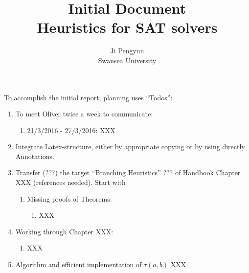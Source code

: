 \documentclass{article}
\begin{document}
\title{Initial Document\\Heuristics for SAT solvers}
\author{Ji Pengyun\\Swansea University}

\maketitle

To accomplish the initial report, planning uses ``Todos'':
\begin{enumerate}
\item To meet Oliver twice a week to communicate:
  \begin{enumerate}[Week 1]
  \item 21/3/2016 - 27/3/2016: XXX
  \end{enumerate}
\item Integrate Latex-structure, either by appropriate copying or by using directly Annotations.
\item Transfer (???) the target ``Branching Heuristics'' ??? of Handbook Chapter XXX (references needed). Start with
  \begin{enumerate}
  \item Missing proofs of Theorems:
    \begin{enumerate}
    \item XXX
    \end{enumerate}
  \end{enumerate}
\item Working through Chapter XXX:
  \begin{enumerate}
  \item XXX
  \end{enumerate}
\item Algorithm and efficient implementation of $\tau(a,b)$ XXX
\end{enumerate}
  
\end{document}
